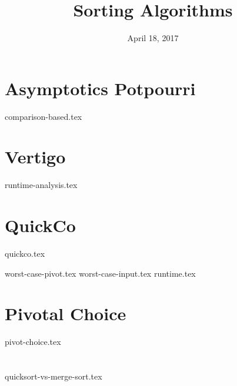 \documentclass[11pt]{exam}
\title{Sorting Algorithms}
\date{April 18, 2017}
\begin{document}
\maketitle

\section{Asymptotics Potpourri}
{comparison-based.tex}

\section{Vertigo}
\begin{questions}
{runtime-analysis.tex}
\end{questions}

\clearpage

\section{QuickCo}
{quickco.tex}
\begin{questions}
{worst-case-pivot.tex}
{worst-case-input.tex}
{runtime.tex}
\end{questions}

\clearpage

\section{Pivotal Choice}
\begin{questions}
{pivot-choice.tex}
\end{questions}

\clearpage

\section{}
\begin{questions}
{quicksort-vs-merge-sort.tex}
\end{questions}
\end{document}
